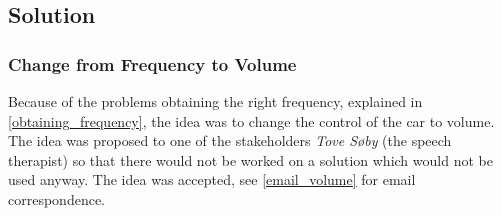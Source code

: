 \subsection{Solution}
\subsubsection{Change from Frequency to Volume}
Because of the problems obtaining the right frequency, explained in \cref{obtaining_frequency}, the idea was to change the control of the car to volume.
The idea was proposed to one of the stakeholders \textit{Tove Søby} (the speech therapist) so that there would not be worked on a solution which would not be used anyway.
The idea was accepted, see \cref{email_volume} for email correspondence.